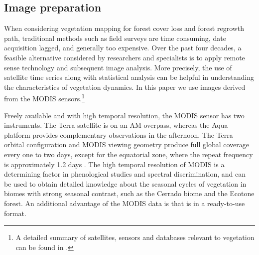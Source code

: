 \subsection{Image preparation}  %

When considering vegetation mapping for forest cover loss and forest regrowth path, traditional methods such as field surveys are time consuming, date acquisition lagged, and generally too expensive. Over the past four decades, a feasible alternative considered by researchers and specialists is to apply remote sense technology and subsequent image analysis. More precisely, the use of satellite time series along with statistical analysis can be helpful in understanding the characteristics of vegetation dynamics. In this paper we use images derived from the MODIS sensors.\footnote{A detailed summary of satellites, sensors and databases relevant to vegetation can be found in \citet{horning_2010}.}


Freely available and with high temporal resolution, the MODIS sensor has two instruments. The Terra satellite is on an AM overpass, whereas the Aqua platform provides complementary observations in the afternoon. The Terra orbital configuration and MODIS viewing geometry produce full global coverage every one to two days, except for the equatorial zone, where the repeat frequency is approximately 1.2 days \citep{zhan_2002, setiawan_2014}. The high temporal resolution of MODIS is a determining factor in phenological studies and spectral discrimination, and can be used to obtain detailed knowledge about the seasonal cycles of vegetation in biomes with strong seasonal contrast, such as the Cerrado biome and the Ecotone forest. An additional advantage of the MODIS data is that is in a ready-to-use format.

